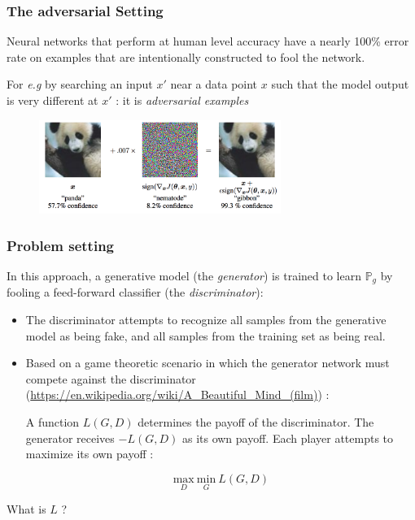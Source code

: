 \documentclass[french,9pt]{beamer}
\begin{document}
\begin{frame}
\frametitle{The adversarial Setting}
Neural networks that perform at human level accuracy have a nearly 100\% error rate on examples that are intentionally constructed to fool the network. 

For \textit{e.g} by searching an input $x'$ near a data point $x$ such that the model output is very different at $x'$ : it is \emph{adversarial examples} \cite{2014arXiv1412.6572G} 

\begin{figure}
  \begin{center}
    \includegraphics[width=0.7\textwidth]{fig/gibon.png}
  \end{center}
\end{figure}


\end{frame}

\begin{frame}
\frametitle{Problem setting}

In this approach, a generative model (the \emph{generator}) is trained to learn $\mathbb{P}_{g}$ by fooling a feed-forward classifier (the \emph{discriminator}):
\begin{itemize}
\item The discriminator attempts to recognize all samples from the generative model as being fake, and all samples from the training set as being real.
\pause
\item Based on a game theoretic scenario in which the generator network must compete against the discriminator (\url{https://en.wikipedia.org/wiki/A_Beautiful_Mind_(film)}) :

\pause 

A function $L(G ,D)$ determines the payoff of the discriminator. The generator receives $-L(G ,D)$ as its own payoff. Each player attempts to maximize its own payoff :

$$\underset{D}{\text{max}} \ \underset{G}{\text{min}} \ L(G ,D)$$

\end{itemize}

What is $L$ ?

\end{frame}
\end{document}
